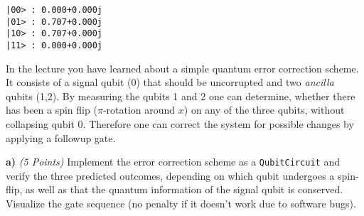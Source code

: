\documentclass[11pt]{article}
\begin{document}
    \begin{Verbatim}[commandchars=\\\{\}]
|00> : 0.000+0.000j
|01> : 0.707+0.000j
|10> : 0.707+0.000j
|11> : 0.000+0.000j

    \end{Verbatim}

    In the lecture you have learned about a simple quantum error correction
scheme. It consists of a signal qubit (0) that should be uncorrupted and
two \emph{ancilla} qubits (1,2). By measuring the qubits 1 and 2 one can
determine, whether there has been a spin flip (\(\pi\)-rotation around
\(x\)) on any of the three qubits, without collapsing qubit 0. Therefore
one can correct the system for possible changes by applying a followup
gate.

\textbf{a)} \emph{(5 Points)} Implement the error correction scheme as a
\texttt{QubitCircuit} and verify the three predicted outcomes, depending
on which qubit undergoes a spin-flip, as well as that the quantum
information of the signal qubit is conserved. Visualize the gate
sequence (no penalty if it doesn't work due to software bugs).
\end{document}
